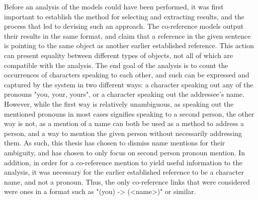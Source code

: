 \documentclass[a4paper, 11pt]{article}
\begin{document}
Before an analysis of the models could have been performed, it was first important to establish the method for selecting and extracting results, and the process that led to devising such an approach. The co-reference models output their results in the same format, and claim that a reference in the given sentence is pointing to the same object as another earlier established reference. This action can present equality between different types of objects, not all of which are compatible with the analysis. The end goal of the analysis is to count the occurrences of characters speaking to each other, and such can be expressed and captured by the system in two different ways: a character speaking out any of the pronouns "you, your, yours", or a character speaking out the addressee's name. However, while the first way is relatively unambiguous, as speaking out the mentioned pronouns in most cases signifies speaking to a second person, the other way is not, as a mention of a name can both be used as a method to address a person, and a way to mention the given person without necessarily addressing them. As such, this thesis has chosen to dismiss name mentions for their ambiguity, and has chosen to only focus on second person pronoun mention. In addition, in order for a co-reference mention to yield useful information to the analysis, it was necessary for the earlier established reference to be a character name, and not a pronoun. Thus, the only co-reference links that were considered were ones in a format such as "(you) -> (<name>)" or similar.
\end{document}
